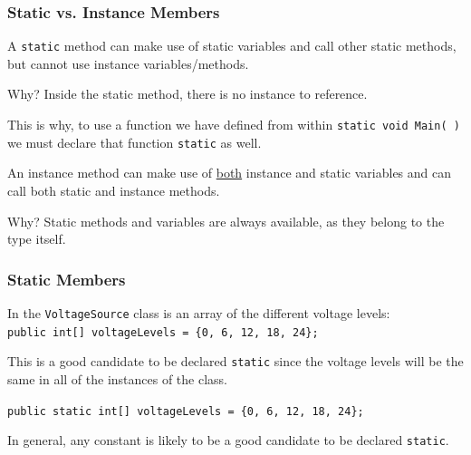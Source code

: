 \begin{frame}
\frametitle{Static vs. Instance Members}

A \texttt{static} method can make use of static variables and call other static methods, but cannot use instance variables/methods.

Why? Inside the static method, there is no instance to reference.

This is why, to use a function we have defined from within \texttt{static void Main( )} we must declare that function \texttt{static} as well.

An instance method can make use of \underline{both} instance and static variables and can call both static and instance methods.

Why? Static methods and variables are always available, as they belong to the type itself.

\end{frame}

\begin{frame}
\frametitle{Static Members}

In the \texttt{VoltageSource} class is an array of the different voltage levels:\\
\quad \texttt{public int[] voltageLevels = \{0, 6, 12, 18, 24\};}

This is a good candidate to be declared \texttt{static} since the voltage levels will be the same in all of the instances of the class.

\texttt{public static int[] voltageLevels = \{0, 6, 12, 18, 24\};}

In general, any constant is likely to be a good candidate to be declared \texttt{static}.

\end{frame}




